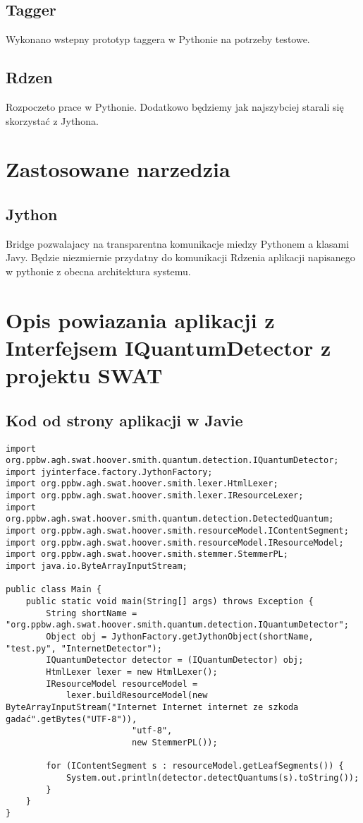 \documentclass[12pt]{article}
\begin{document}
\subsection {Tagger} 
Wykonano wstepny prototyp taggera w Pythonie na potrzeby testowe.
\subsection {Rdzen} 
Rozpoczeto prace  w Pythonie. Dodatkowo będziemy jak najszybciej starali się skorzystać z Jythona.
\section{Zastosowane narzedzia}
\subsection{Jython} Bridge pozwalajacy na transparentna komunikacje miedzy Pythonem a klasami Javy. Będzie niezmiernie przydatny do komunikacji Rdzenia aplikacji napisanego w pythonie z obecna architektura systemu.

\section{Opis powiazania aplikacji z Interfejsem IQuantumDetector z projektu SWAT}
\subsection{Kod od strony aplikacji w Javie}
\begin{verbatim}
import org.ppbw.agh.swat.hoover.smith.quantum.detection.IQuantumDetector;
import jyinterface.factory.JythonFactory;
import org.ppbw.agh.swat.hoover.smith.lexer.HtmlLexer; 
import org.ppbw.agh.swat.hoover.smith.lexer.IResourceLexer; 
import org.ppbw.agh.swat.hoover.smith.quantum.detection.DetectedQuantum; 
import org.ppbw.agh.swat.hoover.smith.resourceModel.IContentSegment; 
import org.ppbw.agh.swat.hoover.smith.resourceModel.IResourceModel; 
import org.ppbw.agh.swat.hoover.smith.stemmer.StemmerPL; 
import java.io.ByteArrayInputStream; 

public class Main {
	public static void main(String[] args) throws Exception {
		String shortName = "org.ppbw.agh.swat.hoover.smith.quantum.detection.IQuantumDetector";
		Object obj = JythonFactory.getJythonObject(shortName, "test.py", "InternetDetector");
		IQuantumDetector detector = (IQuantumDetector) obj;
		HtmlLexer lexer = new HtmlLexer();
		IResourceModel resourceModel = 
			lexer.buildResourceModel(new ByteArrayInputStream("Internet Internet internet ze szkoda gadać".getBytes("UTF-8")), 
						 "utf-8",
						 new StemmerPL());

		for (IContentSegment s : resourceModel.getLeafSegments()) {
			System.out.println(detector.detectQuantums(s).toString());
		}
	}
}

\end{verbatim}
\end{document}
